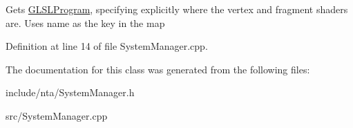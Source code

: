 Gets \hyperlink{classnta_1_1GLSLProgram}{G\+L\+S\+L\+Program}, specifying explicitly where the vertex and fragment shaders are. Uses name as the key in the map 

Definition at line 14 of file System\+Manager.\+cpp.



The documentation for this class was generated from the following files\+:\begin{DoxyCompactItemize}
\item 
include/nta/System\+Manager.\+h\item 
src/System\+Manager.\+cpp\end{DoxyCompactItemize}
